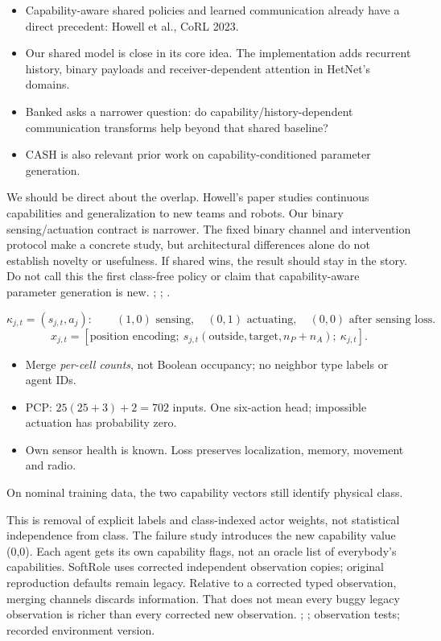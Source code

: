 {\begin{itemize}
\item Capability-aware shared policies and learned communication already have a direct precedent: Howell et al., CoRL 2023.
\item Our shared model is close in its core idea. The implementation adds recurrent history, binary payloads and receiver-dependent attention in HetNet's domains.
\item Banked asks a narrower question: do capability/history-dependent communication transforms help beyond that shared baseline?
\item CASH is also relevant prior work on capability-conditioned parameter generation.
\end{itemize}
}
{We should be direct about the overlap. Howell's paper studies continuous capabilities and generalization to new teams and robots. Our binary sensing/actuation contract is narrower. The fixed binary channel and intervention protocol make a concrete study, but architectural differences alone do not establish novelty or usefulness. If shared wins, the result should stay in the story. Do not call this the first class-free policy or claim that capability-aware parameter generation is new.}
{; ; .}

{\[
\kappa_{j,t}=(s_{j,t},a_j):\qquad (1,0)\text{ sensing},\quad (0,1)\text{ actuating},\quad (0,0)\text{ after sensing loss}.
\]
\[
x_{j,t}=[\text{position encoding};\ s_{j,t}(\text{outside},\text{target},n_P+n_A);\ \kappa_{j,t}].
\]
\begin{itemize}
\item Merge \emph{per-cell counts}, not Boolean occupancy; no neighbor type labels or agent IDs.
\item PCP: $25(25+3)+2=702$ inputs. One six-action head; impossible actuation has probability zero.
\item Own sensor health is known. Loss preserves localization, memory, movement and radio.
\end{itemize}
\small On nominal training data, the two capability vectors still identify physical class.}
{This is removal of explicit labels and class-indexed actor weights, not statistical independence from class. The failure study introduces the new capability value (0,0). Each agent gets its own capability flags, not an oracle list of everybody's capabilities. SoftRole uses corrected independent observation copies; original reproduction defaults remain legacy. Relative to a corrected typed observation, merging channels discards information. That does not mean every buggy legacy observation is richer than every corrected new observation.}
{; ; observation tests; recorded environment version.}

